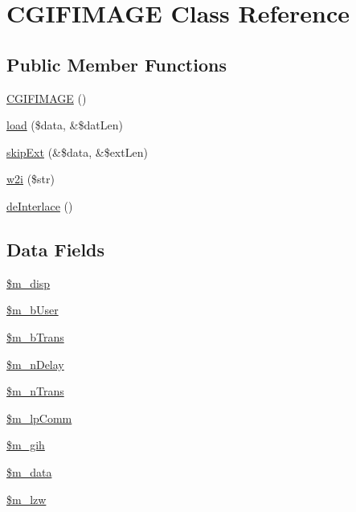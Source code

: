 \hypertarget{class_c_g_i_f_i_m_a_g_e}{\section{\-C\-G\-I\-F\-I\-M\-A\-G\-E \-Class \-Reference}
\label{class_c_g_i_f_i_m_a_g_e}
}
\subsection*{\-Public \-Member \-Functions}
\begin{DoxyCompactItemize}
\item 
\hyperlink{class_c_g_i_f_i_m_a_g_e_aea214ec8cd083ff6e8f1b63d0a4f1435}{\-C\-G\-I\-F\-I\-M\-A\-G\-E} ()
\item 
\hyperlink{class_c_g_i_f_i_m_a_g_e_a42a4fbb9065f77c8c091f30fbc808691}{load} (\$data, \&\$dat\-Len)
\item 
\hyperlink{class_c_g_i_f_i_m_a_g_e_a5f948bf738c7b08c78f2668a3704ce3c}{skip\-Ext} (\&\$data, \&\$ext\-Len)
\item 
\hyperlink{class_c_g_i_f_i_m_a_g_e_abb8cc80a6812d7c5476d1eab3bade1cc}{w2i} (\$str)
\item 
\hyperlink{class_c_g_i_f_i_m_a_g_e_a7ecf7192fc0fd97a0d8d7b48640294ba}{de\-Interlace} ()
\end{DoxyCompactItemize}
\subsection*{\-Data \-Fields}
\begin{DoxyCompactItemize}
\item 
\hyperlink{class_c_g_i_f_i_m_a_g_e_af1f750bf7a08cca91e6b59c057c151ed}{\$m\-\_\-disp}
\item 
\hyperlink{class_c_g_i_f_i_m_a_g_e_a9bf034a04ebeb5e5e362aaa5acf364de}{\$m\-\_\-b\-User}
\item 
\hyperlink{class_c_g_i_f_i_m_a_g_e_ac59a3a6cbefe5e88bb2fb75b3d262130}{\$m\-\_\-b\-Trans}
\item 
\hyperlink{class_c_g_i_f_i_m_a_g_e_a67a880e8d176d96e08fcf0583c96308c}{\$m\-\_\-n\-Delay}
\item 
\hyperlink{class_c_g_i_f_i_m_a_g_e_a7a1b257d70e45e377ed012c9d972a3c1}{\$m\-\_\-n\-Trans}
\item 
\hyperlink{class_c_g_i_f_i_m_a_g_e_a2ec1ee850534eaf0be7521e963c66f90}{\$m\-\_\-lp\-Comm}
\item 
\hyperlink{class_c_g_i_f_i_m_a_g_e_a1b85f381b7c0755a13e146611890c96f}{\$m\-\_\-gih}
\item 
\hyperlink{class_c_g_i_f_i_m_a_g_e_ab8f933493a79963aece23fd98ae1cbeb}{\$m\-\_\-data}
\item 
\hyperlink{class_c_g_i_f_i_m_a_g_e_a0c0944d78ee95a2a837ae8f3441882ce}{\$m\-\_\-lzw}
\end{DoxyCompactItemize}



